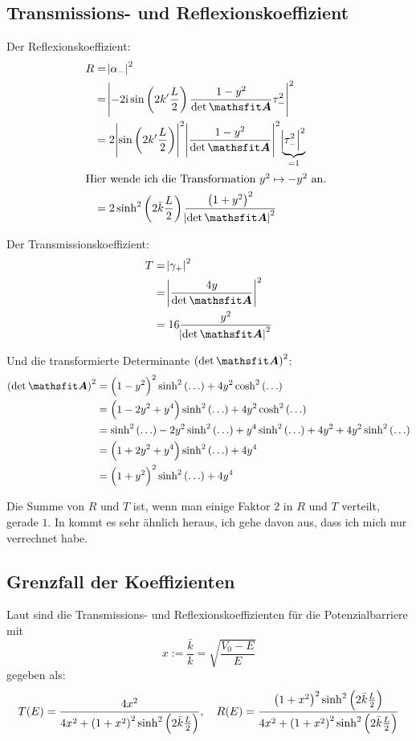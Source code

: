 \subsection{Transmissions- und Reflexionskoeffizient}

Der Reflexionskoeffizient:
\begin{align*}
	R
	&= \abs{\alpha_-}^2 \\
	&= \abs{-2 \ii \sin\del{2 k' \frac L2} \frac{1-y^2}{\detA} \tau_-^2}^2 \\
	&= 2 \abs{\sin\del{2 k' \frac L2}}^2 \abs{\frac{1-y^2}{\detA}}^2 \underbrace{\abs{\tau_-^2}^2}_{=1} \\
	\intertext{%
		Hier wende ich die Transformation $y^2 \mapsto - y^2$ an.
	}
	&= 2 \sinh^2\del{2 \bar k \frac L2} \frac{\del{1+y^2}^2}{\abs{\detA}^2}
\end{align*}

Der Transmissionskoeffizient:
\begin{align*}
	T
	&= \abs{\gamma_+}^2 \\
	&= \abs{\frac{4y}\detA}^2 \\
	&= 16 \frac{y^2}{\abs{\detA}^2}
\end{align*}

Und die transformierte Determinante $\del{\detA}^2$:
\begin{align*}
	\del\detA^2
	&= \del{1-y^2}^2 \sinh^2\del\ldots + 4 y^2 \cosh^2\del\ldots \\
	&= \del{1-2y^2+y^4} \sinh^2\del\ldots + 4 y^2 \cosh^2\del\ldots \\
	&= \sinh^2\del\ldots - 2 y^2\sinh^2\del\ldots + y^4 \sinh^2\del\ldots + 4 y^2 + 4 y^2 \sinh^2\del\ldots \\
	&= \del{1 + 2 y^2 + y^4} \sinh^2\del\ldots + 4 y^4 \\
	&= \del{1 + y^2}^2 \sinh^2\del\ldots + 4 y^4
\end{align*}

Die Summe von $R$ und $T$ ist, wenn man einige Faktor $2$ in $R$ und $T$
verteilt, gerade $1$. In \cite[Seite 283]{nolting-theo5} kommt es sehr ähnlich
heraus, ich gehe davon aus, dass ich mich nur verrechnet habe.

\subsection{Grenzfall der Koeffizienten}

Laut \cite[Seite 283]{nolting-theo5} sind die Transmissions- und
Reflexionskoeffizienten für die Potenzialbarriere mit
\[
	x := \frac{\bar k}{k} = \sqrt{\frac{V_0-E}E}
\]
gegeben als:
\[
	T(E) = \frac{4x^2}{4x^2 + \del{1+x^2}^2 \sinh^2\del{2 \bar k \frac L2}}
	\eqnsep
	R(E) = \frac{\del{1+x^2}^2 \sinh^2\del{2 \bar k \frac L2}}
	{4x^2 + \del{1+x^2}^2 \sinh^2\del{2 \bar k \frac L2}}
\]

